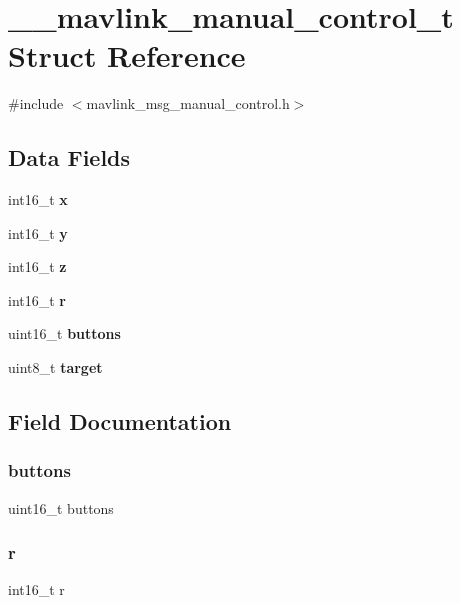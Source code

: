 \section{\+\_\+\+\_\+mavlink\+\_\+manual\+\_\+control\+\_\+t Struct Reference}
\label{struct____mavlink__manual__control__t}


{\ttfamily \#include $<$mavlink\+\_\+msg\+\_\+manual\+\_\+control.\+h$>$}

\subsection*{Data Fields}
\begin{DoxyCompactItemize}
\item 
int16\+\_\+t \textbf{ x}
\item 
int16\+\_\+t \textbf{ y}
\item 
int16\+\_\+t \textbf{ z}
\item 
int16\+\_\+t \textbf{ r}
\item 
uint16\+\_\+t \textbf{ buttons}
\item 
uint8\+\_\+t \textbf{ target}
\end{DoxyCompactItemize}


\subsection{Field Documentation}
\mbox{\label{struct____mavlink__manual__control__t_a4e1392d4e76367aa3f8989638f05d156}} 
\subsubsection{buttons}
{\footnotesize\ttfamily uint16\+\_\+t buttons}

\mbox{\label{struct____mavlink__manual__control__t_a74b8c08df7325dfc7c6c5191407a2c44}} 
\subsubsection{r}
{\footnotesize\ttfamily int16\+\_\+t r}

